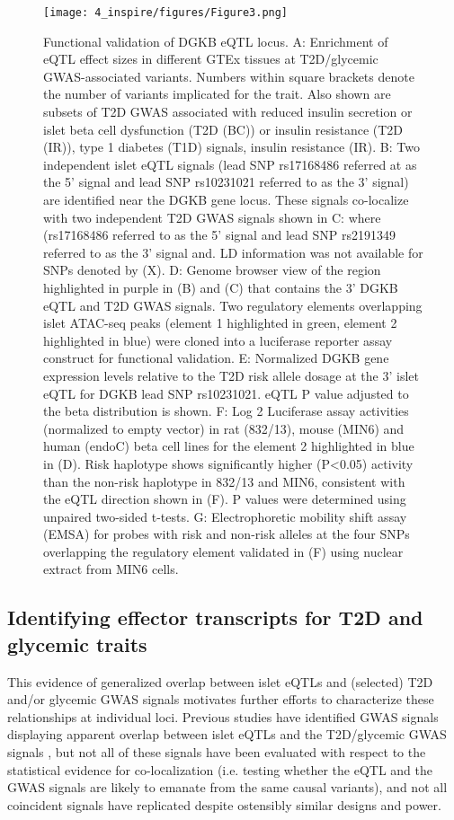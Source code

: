 \begin{figure}
    \centering
    \texttt{[image: 4\_inspire/figures/Figure3.png]}
    \caption[Functional validation of DGKB eQTL locus]{Functional validation of DGKB eQTL locus. A: Enrichment of eQTL effect sizes in different GTEx tissues at T2D/glycemic GWAS-associated variants. Numbers within square brackets denote the number of variants implicated for the trait. Also shown are subsets of T2D GWAS associated with reduced insulin secretion or islet beta cell dysfunction (T2D (BC)) or insulin resistance (T2D (IR)), type 1 diabetes (T1D) signals, insulin resistance (IR). B: Two independent islet eQTL signals (lead SNP rs17168486 referred at as the 5' signal and lead SNP rs10231021 referred to as the 3' signal) are identified near the DGKB gene locus. These signals co-localize with two independent T2D GWAS signals shown in C: where (rs17168486 referred to as the 5' signal and lead SNP rs2191349 referred to as the 3' signal and. LD information was not available for SNPs denoted by (X). D: Genome browser view of the region highlighted in purple in (B) and (C) that contains the 3' DGKB eQTL and T2D GWAS signals. Two regulatory elements overlapping islet ATAC-seq peaks (element 1 highlighted in green, element 2 highlighted in blue) were cloned into a luciferase reporter assay construct for functional validation. E: Normalized DGKB gene expression levels relative to the T2D risk allele dosage at the 3' islet eQTL for DGKB lead SNP rs10231021. eQTL P value adjusted to the beta distribution is shown. F: Log 2 Luciferase assay activities (normalized to empty vector) in rat (832/13), mouse (MIN6) and human (endoC) beta cell lines for the element 2 highlighted in blue in (D). Risk haplotype shows significantly higher (P<0.05) activity than the non-risk haplotype in 832/13 and MIN6, consistent with the eQTL direction shown in (F). P values were determined using unpaired two-sided t-tests. G: Electrophoretic mobility shift assay (EMSA) for probes with risk and non-risk alleles at the four SNPs overlapping the regulatory element validated in (F) using nuclear extract from MIN6 cells.}
    \label{fig:c4_f3}
  \end{figure}
  
\subsection{Identifying effector transcripts for T2D and glycemic traits}
This evidence of generalized overlap between islet eQTLs and (selected) T2D and/or glycemic GWAS signals motivates further efforts to characterize these relationships at individual loci. Previous studies have identified GWAS signals displaying apparent overlap between islet eQTLs and the T2D/glycemic GWAS signals \cite{varshneyGeneticRegulatorySignatures2017, fadistaGlobalGenomicTranscriptomic2014, vandebuntTranscriptExpressionData2015}, but not all of these signals have been evaluated with respect to the statistical evidence for co-localization (i.e. testing whether the eQTL and the GWAS signals are likely to emanate from the same causal variants), and not all coincident signals have replicated despite ostensibly similar designs and power. \\

